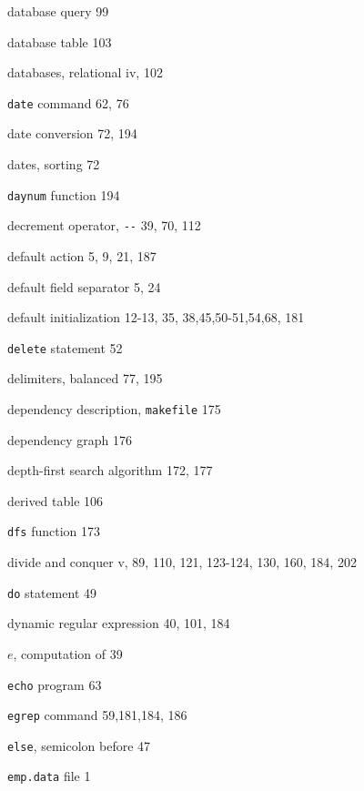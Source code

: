 \begin{multicols}{3}
\hangindent=4pc  database query 99

\hangindent=4pc  database table 103

\hangindent=4pc  databases, relational iv, 102


\hangindent=4pc  \verb'date' command 62, 76

\hangindent=4pc  date conversion 72, 194

\hangindent=4pc  dates, sorting 72

\hangindent=4pc  \verb'daynum' function 194

\hangindent=4pc  decrement operator, \verb'--' 39, 70, 112

\hangindent=4pc  default action 5, 9, 21, 187

\hangindent=4pc  default field separator 5, 24

\hangindent=4pc  default initialization 12-13, 35, 38,45,50-51,54,68, 181

\hangindent=4pc  \verb'delete' statement 52

\hangindent=4pc  delimiters, balanced 77, 195

\hangindent=4pc  dependency description, \verb'makefile' 175

\hangindent=4pc  dependency graph 176

\hangindent=4pc  depth-first search algorithm 172, 177

\hangindent=4pc  derived table 106

\hangindent=4pc  \verb'dfs' function 173

\hangindent=4pc  divide and conquer v, 89, 110, 121, 123-124, 130, 160, 184, 202

\hangindent=4pc  \verb'do' statement 49

\hangindent=4pc  dynamic regular expression 40,  101, 184

\hangindent=4pc  $e$, computation of 39

\hangindent=4pc  \verb'echo' program 63

\hangindent=4pc  \verb'egrep' command 59,181,184, 186

\hangindent=4pc  \verb'else', semicolon before 47

\hangindent=4pc  \verb'emp.data' file 1


\end{multicols}
